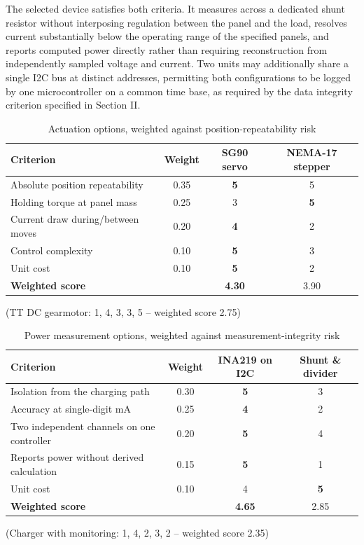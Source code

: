 \documentclass[journal]{IEEEtran}
\begin{document}
The selected device satisfies both criteria. It measures across a dedicated shunt
resistor without interposing regulation between the panel and the load, resolves
current substantially below the operating range of the specified panels, and reports
computed power directly rather than requiring reconstruction from independently sampled
voltage and current. Two units may additionally share a single I2C bus at distinct
addresses, permitting both configurations to be logged by one microcontroller on a
common time base, as required by the data integrity criterion specified in Section II.

\begin{table}[h]
\centering
\caption{Actuation options, weighted against position-repeatability risk}
\label{tab:actuation}
\small
\begin{tabular}{@{}p{2.7cm}ccc@{}}
\toprule
\textbf{Criterion} & \textbf{Weight} & \textbf{SG90 servo} & \textbf{NEMA-17 stepper} \\
\midrule
Absolute position repeatability & 0.35 & \textbf{5} & 5 \\
Holding torque at panel mass & 0.25 & 3 & \textbf{5} \\
Current draw during/between moves & 0.20 & \textbf{4} & 2 \\
Control complexity & 0.10 & \textbf{5} & 3 \\
Unit cost & 0.10 & \textbf{5} & 2 \\
\midrule
\textbf{Weighted score} & & \textbf{4.30} & 3.90 \\
\bottomrule
\end{tabular}

\vspace{2mm}
\small (TT DC gearmotor: 1, 4, 3, 3, 5 -- weighted score 2.75)
\end{table}

\begin{table}[h]
\centering
\caption{Power measurement options, weighted against measurement-integrity risk}
\label{tab:power}
\small
\begin{tabular}{@{}p{2.7cm}ccc@{}}
\toprule
\textbf{Criterion} & \textbf{Weight} & \textbf{INA219 on I2C} & \textbf{Shunt \& divider} \\
\midrule
Isolation from the charging path & 0.30 & \textbf{5} & 3 \\
Accuracy at single-digit mA & 0.25 & \textbf{4} & 2 \\
Two independent channels on one controller & 0.20 & \textbf{5} & 4 \\
Reports power without derived calculation & 0.15 & \textbf{5} & 1 \\
Unit cost & 0.10 & 4 & \textbf{5} \\
\midrule
\textbf{Weighted score} & & \textbf{4.65} & 2.85 \\
\bottomrule
\end{tabular}

\vspace{2mm}
\small (Charger with monitoring: 1, 4, 2, 3, 2 -- weighted score 2.35)
\end{table}
\end{document}
